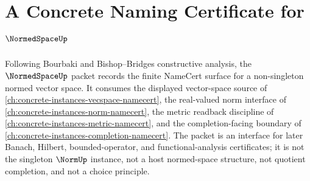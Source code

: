 \chapter{A Concrete Naming Certificate for $\NormedSpaceUp$}
\label{ch:concrete-instances-normedspace-namecert}

Following Bourbaki and Bishop--Bridges constructive analysis, the $\NormedSpaceUp$ packet records the finite NameCert surface for a non-singleton normed vector space. It consumes the displayed vector-space source of \autoref{ch:concrete-instances-vecspace-namecert}, the real-valued norm interface of \autoref{ch:concrete-instances-norm-namecert}, the metric readback discipline of \autoref{ch:concrete-instances-metric-namecert}, and the completion-facing boundary of \autoref{ch:concrete-instances-completion-namecert}. The packet is an interface for later Banach, Hilbert, bounded-operator, and functional-analysis certificates; it is not the singleton $\NormUp$ instance, not a host normed-space structure, not quotient completion, and not a choice principle.

